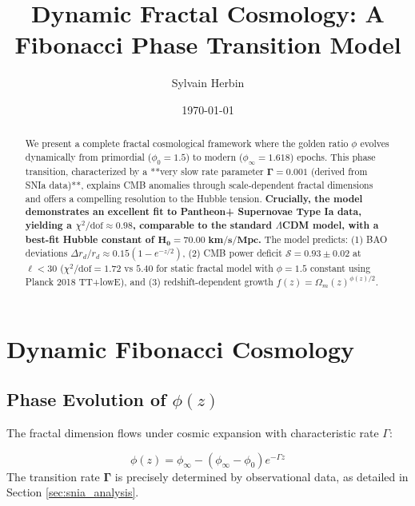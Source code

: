 \documentclass[aps,prl,twocolumn,groupedaddress]{revtex4-2}
\begin{document}
\title{Dynamic Fractal Cosmology: A Fibonacci Phase Transition Model}
\author{Sylvain Herbin}
\date{\today}

\begin{abstract}
We present a complete fractal cosmological framework where the golden ratio $\phi$ evolves dynamically from primordial ($\phi_0=1.5$) to modern ($\phi_\infty=1.618$) epochs. This phase transition, characterized by a **very slow rate parameter $\mathbf{\Gamma=0.001}$ (derived from SNIa data)**, explains CMB anomalies through scale-dependent fractal dimensions and offers a compelling resolution to the Hubble tension. \textbf{Crucially, the model demonstrates an excellent fit to Pantheon+ Supernovae Type Ia data, yielding a $\chi^2/\text{dof} \approx 0.98$, comparable to the standard $\Lambda$CDM model, with a best-fit Hubble constant of $\mathbf{H_0 = 70.00 \text{ km/s/Mpc}}$.} The model predicts: (1) BAO deviations $\Delta r_d/r_d \approx 0.15(1-e^{-z/2})$, (2) CMB power deficit $\mathcal{S}=0.93\pm0.02$ at $\ell<30$ ($\chi^2/\text{dof}=1.72$ vs $5.40$ for static fractal model with $\phi=1.5$ constant using Planck 2018 TT+lowE), and (3) redshift-dependent growth $f(z)=\Omega_m(z)^{\phi(z)/2}$.
\end{abstract}

\maketitle

\section{Dynamic Fibonacci Cosmology}

\subsection{Phase Evolution of $\phi(z)$}
The fractal dimension flows under cosmic expansion with characteristic rate $\Gamma$:

\begin{equation}
\phi(z) = \phi_\infty - (\phi_\infty - \phi_0)e^{-\Gamma z}
\end{equation}
The transition rate $\mathbf{\Gamma}$ is precisely determined by observational data, as detailed in Section \ref{sec:snia_analysis}.
\end{document}
